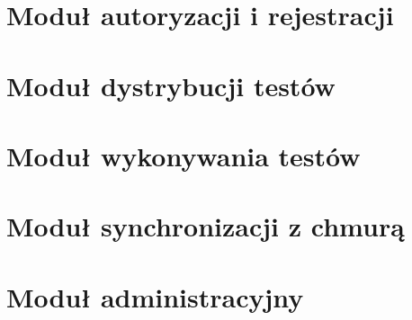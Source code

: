 \documentclass[12pt, a4paper, oneside]{report}
\begin{document}
\section{Moduł autoryzacji i rejestracji}
\label{sec:impl-auth}



\section{Moduł dystrybucji testów}
\label{sec:impl-dystrybucja}



\section{Moduł wykonywania testów}
\label{sec:impl-testy}



\section{Moduł synchronizacji z chmurą}
\label{sec:impl-sync}



\section{Moduł administracyjny}
\label{sec:impl-admin}

\end{document}
